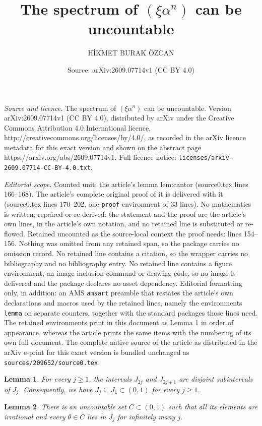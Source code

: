 \documentclass[10pt,a4paper]{amsart}
\title{The spectrum of $(\xi\alpha^n)$ can be uncountable}
\author{H\.IKMET BURAK \"OZCAN}
\date{Source: arXiv:2609.07714v1 (CC BY 4.0)}
\newtheorem{lemma}{Lemma}
\begin{document}
\maketitle

\noindent\emph{Source and licence.} The spectrum of $(\xi\alpha^n)$ can be uncountable. Version arXiv:2609.07714v1 (CC BY 4.0), distributed by arXiv under the Creative Commons Attribution 4.0 International licence, http://creativecommons.org/licenses/by/4.0/, as recorded in the arXiv licence metadata for this exact version and shown on the abstract page https://arxiv.org/abs/2609.07714v1. Full licence notice: \texttt{licenses/arxiv-2609.07714-CC-BY-4.0.txt}.\par\smallskip

\noindent\textit{Editorial scope.} Counted unit: the article's lemma lem:cantor (source0.tex lines 166--168). The article's complete original proof of it is delivered with it (source0.tex lines 170--202, one \texttt{proof} environment of 33 lines). No mathematics is written, repaired or re-derived: the statement and the proof are the article's own lines, in the article's own notation, and no retained line is substituted or re-flowed.  Retained uncounted as the source-local context the proof needs: lines 154--156.  Nothing was omitted from any retained span, so the package carries no omission record.  No retained line contains a citation, so the wrapper carries no bibliography and no bibliography entry.  No retained line contains a figure environment, an image-inclusion command or drawing code, so no image is delivered and the package declares no asset dependency.  Editorial formatting only, in addition: an AMS \texttt{amsart} preamble that restates the article's own declarations and macros used by the retained lines, namely the environments \texttt{lemma} on separate counters, together with the standard packages those lines need.  The retained environments print in this document as Lemma 1 in order of appearance, whereas the article prints the same items with the numbering of its own full document.  The complete native source of the article as distributed in the arXiv e-print for this exact version is bundled unchanged as \texttt{sources/209652/source0.tex}.
\begin{lemma}\label{lem:tree}
For every $j\ge1$, the intervals $J_{2j}$ and $J_{2j+1}$ are disjoint subintervals of $J_j$. Consequently, we have $J_j\subseteq J_1\subset(0,1)$ for every $j\ge1$.
\end{lemma}

\begin{lemma}\label{lem:cantor}
There is an uncountable set $C\subset(0,1)$ such that all its elements are irrational and every $\theta\in C$ lies in $J_j$ for infinitely many $j$.
\end{lemma}
\end{document}
